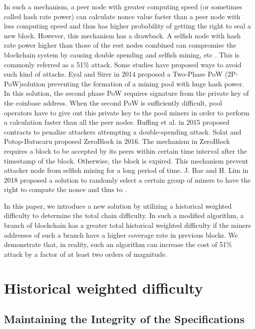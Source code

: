 \documentclass[conference]{IEEEtran}
\begin{document}
In such a mechanism, a peer node with greater computing speed (or sometimes called hash rate power) can calculate nonce value faster than a peer node with less computing speed and thus has higher probability of getting the right to seal a new block. However, this mechanism has a drawback. A selfish node with hash rate power higher than those of the rest nodes combined can compromise the blockchain system by causing double spending and selfish mining, etc \cite{b3}\cite{b4}. This is commonly referred as a 51\% attack. Some studies have proposed ways to avoid such kind of attacks. Eyal and Sirer \cite{b5} in 2014 proposed a Two-Phase PoW (2P-PoW)solution preventing the formation of a mining pool with huge hash power. In this solution, the second phase PoW requires signature from the private key of the coinbase address. When the second PoW is sufficiently difficult, pool operators have to give out this private key to the pool miners in order to perform a calculation faster than all the peer nodes. Ruffing et al. \cite{b6} in 2015 proposed contracts to penalize attackers attempting a double-spending attack. Solat and Potop-Butucaru proposed ZeroBlock \cite{b7} in 2016. The mechanism in ZeroBlock requires a block to be accepted by its peers within certain time interval after the timestamp of the block. Otherwise, the block is expired. This mechanism prevent attacker node from selfish mining for a long period of time. J. Bae and H. Lim \cite{b8} in 2018 proposed a solution to randomly select a certain group of miners to have the right to compute the nonce and thus to .

In this paper, we introduce a new solution by utilizing a historical weighted difficulty to determine the total chain difficulty. In such a modified algorithm, a branch of blockchain has a greater total historical weighted difficulty if the miners addresses of such a branch have a higher coverage rate in previous blocks. We demonstrate that, in reality, such an algorithm can increase the cost of 51\% attack by a factor of at least two orders of magnitude.

\section{Historical weighted difficulty}


\subsection{Maintaining the Integrity of the Specifications}
\end{document}
